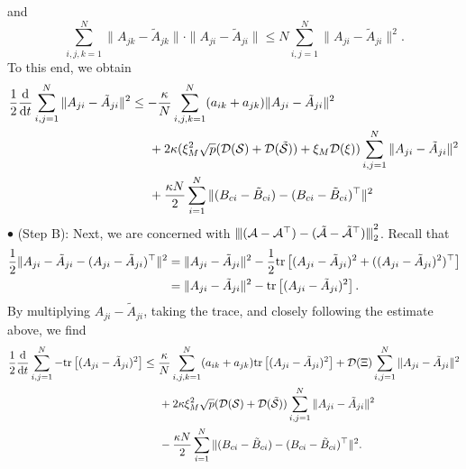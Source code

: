 \documentclass[11pt,reqno]{amsart}
\numberwithin{figure}{section}
\newcommand{\opnorm}[1]{{ \vert\kern-0.25ex \vert\kern-0.25ex \vert #1 
     \vert\kern-0.25ex \vert\kern-0.25ex \vert}}
\newcommand{\kp}{\kappa}
\newcommand{\dd}{  {\textup{d}} }
\newcommand{\dt} {    {  \textup{d}t   }    }
\begin{document}
and
\[
\sum_{i,j,k=1}^N \|A_{jk} - \tilde A_{jk}\|\cdot  \| A_{ji} - \tilde A_{ji}\| \leq N \sum_{i,j=1}^N \|A_{ji} - \tilde A_{ji}\|^2.
\]
To this end,  we obtain 
\begin{align} \label{F-30}
\begin{aligned}
\frac12\frac\dd\dt \sum_{i,j=1}^N \|A_{ji} - \tilde A_{ji}\|^2 & \leq -\frac\kp N \sum_{i,j,k=1}^N (a_{ik} + a_{jk}) \|A_{ji} - \tilde A_{ji}\|^2  \\
& \hspace{0.5cm}  + 2\kp ( \xi_M^2 \sqrt p(\mathcal D(\mathcal S)  + \mathcal D(\tilde{\mathcal S})) + \xi_M \mathcal D(\xi))  \sum_{i,j=1}^N \|A_{ji} - \tilde A_{ji}\|^2 \\
& \hspace{0.5cm}  +\frac {\kappa N}2 \sum_{i=1}^N \| (B_{ci} - \tilde B_{ci})- (B_{ci} - \tilde B_{ci})^\top \|^2
\end{aligned}
\end{align}
\noindent $\bullet$ (Step B): Next, we are concerned with $\opnorm{(\mathcal A - \mathcal A^\top) - (\tilde{\mathcal A} - \tilde{\mathcal A}^\top)}_2^2$. Recall that 
\[
\begin{aligned}
\frac 12\|A_{ji} - \tilde A_{ji} - (A_{ji} - \tilde A_{ji})^\top \|^2 
&= \|A_{ji} - \tilde A_{ji} \|^2 -\frac{1}{2} \textup{tr} \left[(A_{ji} - \tilde A_{ji})^2+((A_{ji} - \tilde A_{ji})^2)^\top\right]\\
&=\|A_{ji} - \tilde A_{ji} \|^2-\textup{tr}\left[( A_{ji}-\tilde A_{ji})^2\right].
\end{aligned}
\]
By multiplying $A_{ji} - \tilde A_{ji}$, taking the trace, and closely following the estimate above, we find
\begin{align} \label{F-35}
\begin{aligned}
\frac12\frac\dd\dt \sum_{i,j=1}^N -\textup{tr} \left[( A_{ji}-\tilde A_{ji})^2\right]  & \leq  \frac\kp N \sum_{i,j,k=1}^N (a_{ik} + a_{jk}) \textup{tr} \left[( A_{ji} - \tilde A_{ji})^2\right]  + \mathcal D( \Xi) \sum_{i,j=1}^N \|A_{ji} - \tilde A_{ji}\|^2 \\
&  \hspace{0.5cm} + 2\kp \xi_M^2 \sqrt p ( \mathcal D( \mathcal S) + \mathcal D( \tilde{\mathcal S})) \sum_{i,j=1}^N \|A_{ji} - \tilde A_{ji}\|^2 \\
&  \hspace{0.5cm} - \frac {\kappa N}{2} \sum_{i=1}^N \|(B_{ci}- \tilde B_{ci}) - (B_{ci} - \tilde B_{ci})^\top \|^2 .
\end{aligned}
\end{align}
\end{document}

